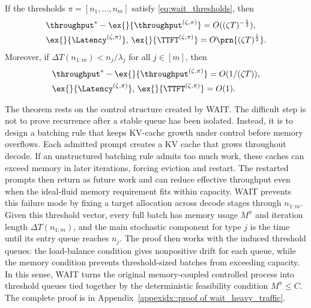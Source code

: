 \begin{theorem}
\label{thm:wait_heavy_traffic}
If the thresholds \(\pi=[n_1,\dots,n_m]\) satisfy \eqref{eq:wait_thresholds}, then
\[
\begin{aligned}
&\throughput^*-\ex{}{\throughput^{(\zeta,\pi)}}=O((\zeta T)^{-\frac{1}{2}}),\\
&\ex{}{\Latency^{(\zeta,\pi)}},\,\ex{}{\TTFT^{(\zeta,\pi)}}=O\prn{(\zeta T)^{\frac{1}{2}}}.
\end{aligned}
\]
Moreover, if \(\Delta T(n_{1:m})<n_j/\lambda_j\) for all \(j\in[m]\), then
\[
\begin{aligned}
&\throughput^* - \ex{}{\throughput^{(\zeta,\pi)}} = O(1/(\zeta T)), \\
&\ex{}{\Latency^{(\zeta,\pi)}},\, \ex{}{\TTFT^{(\zeta,\pi)}} = O(1).
\end{aligned}
\]
\end{theorem}

The theorem rests on the control structure created by WAIT. The difficult step is not to prove recurrence after a stable queue has been isolated. Instead, it is to design a batching rule that keeps KV-cache growth under control before memory overflows. Each admitted prompt creates a KV cache that grows throughout decode. If an unstructured batching rule admits too much work, these caches can exceed memory in later iterations, forcing eviction and restart. The restarted prompts then return as future work and can reduce effective throughput even when the ideal-fluid memory requirement fits within capacity. WAIT prevents this failure mode by fixing a target allocation across decode stages through \(n_{1:m}\). Given this threshold vector, every full batch has memory usage \(M^\pi\) and iteration length \(\Delta T(n_{1:m})\), and the main stochastic component for type \(j\) is the time until its entry queue reaches \(n_j\). The proof then works with the induced threshold queues: the load-balance condition gives nonpositive drift for each queue, while the memory condition prevents threshold-sized batches from exceeding capacity. In this sense, WAIT turns the original memory-coupled controlled process into threshold queues tied together by the deterministic feasibility condition \(M^\pi\le C\). The complete proof is in Appendix~\ref{appexidx::proof of wait_heavy_traffic}.

